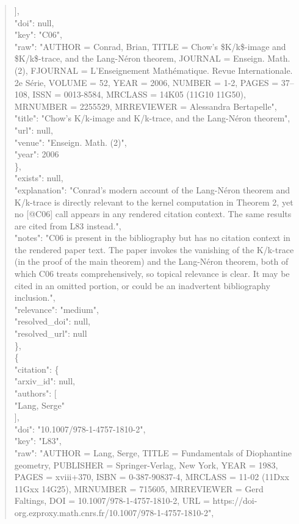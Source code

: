 \documentclass[11pt]{article}
\begin{document}
\begin{quote}
        ],\\
        "doi": null,\\
        "key": "C06",\\
        "raw": "AUTHOR = Conrad, Brian, TITLE = Chow's \$K/k\$-image and \$K/k\$-trace, and the Lang-Néron theorem, JOURNAL = Enseign. Math. (2), FJOURNAL = L'Enseignement Mathématique. Revue Internationale. 2e Série, VOLUME = 52, YEAR = 2006, NUMBER = 1-2, PAGES = 37--108, ISSN = 0013-8584, MRCLASS = 14K05 (11G10 11G50), MRNUMBER = 2255529, MRREVIEWER = Alessandra Bertapelle",\\
        "title": "Chow's K/k-image and K/k-trace, and the Lang-Néron theorem",\\
        "url": null,\\
        "venue": "Enseign. Math. (2)",\\
        "year": 2006\\
      \},\\
      "exists": null,\\
      "explanation": "Conrad's modern account of the Lang-Néron theorem and K/k-trace is directly relevant to the kernel computation in Theorem 2, yet no [@C06] call appears in any rendered citation context. The same results are cited from L83 instead.",\\
      "notes": "C06 is present in the bibliography but has no citation context in the rendered paper text. The paper invokes the vanishing of the K/k-trace (in the proof of the main theorem) and the Lang-Néron theorem, both of which C06 treats comprehensively, so topical relevance is clear. It may be cited in an omitted portion, or could be an inadvertent bibliography inclusion.",\\
      "relevance": "medium",\\
      "resolved\_doi": null,\\
      "resolved\_url": null\\
    \},\\
    \{\\
      "citation": \{\\
        "arxiv\_id": null,\\
        "authors": [\\
          "Lang, Serge"\\
        ],\\
        "doi": "10.1007/978-1-4757-1810-2",\\
        "key": "L83",\\
        "raw": "AUTHOR = Lang, Serge, TITLE = Fundamentals of Diophantine geometry, PUBLISHER = Springer-Verlag, New York, YEAR = 1983, PAGES = xviii+370, ISBN = 0-387-90837-4, MRCLASS = 11-02 (11Dxx 11Gxx 14G25), MRNUMBER = 715605, MRREVIEWER = Gerd Faltings, DOI = 10.1007/978-1-4757-1810-2, URL = https://doi-org.ezproxy.math.cnrs.fr/10.1007/978-1-4757-1810-2",\\

\end{quote}
\end{document}
